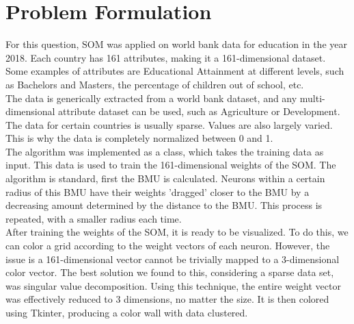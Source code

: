 \documentclass[12pt]{report} %
\begin{document}
\section{Problem Formulation}
For this question, SOM was applied on world bank data for education in the year 2018. Each country has 161 attributes, making it a 161-dimensional dataset. Some examples of attributes are Educational Attainment at different levels, such as Bachelors and Masters, the percentage of children out of school, etc.\\
The data is generically extracted from a world bank dataset, and any multi-dimensional attribute dataset can be used, such as Agriculture or Development. The data for certain countries is usually sparse. Values are also largely varied. This is why the data is completely normalized between 0 and 1.\\
The algorithm was implemented as a class, which takes the training data as input. This data is used to train the 161-dimensional weights of the SOM. The algorithm is standard, first the BMU is calculated. Neurons within a certain radius of this BMU have their weights 'dragged' closer to the BMU by a decreasing amount determined by the distance to the BMU. This process is repeated, with a smaller radius each time. \\
After training the weights of the SOM, it is ready to be visualized. To do this, we can color a grid according to the weight vectors of each neuron. However, the issue is a 161-dimensional vector cannot be trivially mapped to a 3-dimensional color vector. The best solution we found to this, considering a sparse data set, was singular value decomposition. Using this technique, the entire weight vector was effectively reduced to 3 dimensions, no matter the size. It is then colored using Tkinter, producing a color wall with data clustered.
\newpage
\end{document}
